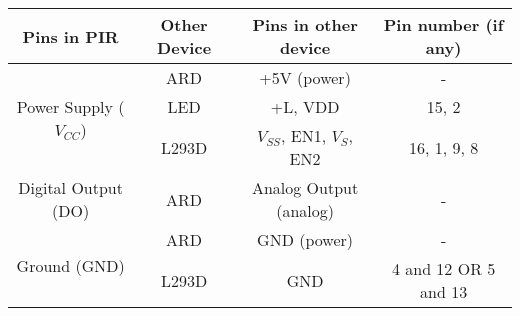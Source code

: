 
\begin{table}[H]
    \centering
    \begin{tabular}{|c|c|c|c|}
    \hline
    \textbf{Pins in PIR} & \textbf{Other Device} & \textbf{Pins in other device} & \textbf{Pin number (if any)} \\
    \hline
    \multirow{3}{*}{Power Supply ($V_{CC}$)} & ARD & +5V (power) & - \\
    \cline{2-4}
    & LED & +L, VDD & 15, 2 \\
    \cline{2-4}
    & L293D & $V_{SS}$, EN1, $V_S$, EN2 & 16, 1, 9, 8 \\
    \hline
    Digital Output (DO) & ARD & Analog Output (analog) & - \\
    \hline
    \multirow{2}{*}{Ground (GND)} & ARD & GND (power) & - \\
    \cline{2-4}
     & L293D & GND & 4 and 12 OR 5 and 13 \\
    \hline
    \end{tabular}
\end{table}


